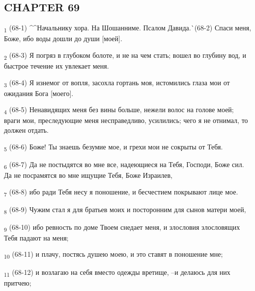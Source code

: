 \subsection{CHAPTER 69}
\begin{tcolorbox}
\textsubscript{1} (68-1) ^^Начальнику хора. На Шошанниме. Псалом Давида.^^ (68-2) Спаси меня, Боже, ибо воды дошли до души [моей].
\end{tcolorbox}
\begin{tcolorbox}
\textsubscript{2} (68-3) Я погряз в глубоком болоте, и не на чем стать; вошел во глубину вод, и быстрое течение их увлекает меня.
\end{tcolorbox}
\begin{tcolorbox}
\textsubscript{3} (68-4) Я изнемог от вопля, засохла гортань моя, истомились глаза мои от ожидания Бога [моего].
\end{tcolorbox}
\begin{tcolorbox}
\textsubscript{4} (68-5) Ненавидящих меня без вины больше, нежели волос на голове моей; враги мои, преследующие меня несправедливо, усилились; чего я не отнимал, то должен отдать.
\end{tcolorbox}
\begin{tcolorbox}
\textsubscript{5} (68-6) Боже! Ты знаешь безумие мое, и грехи мои не сокрыты от Тебя.
\end{tcolorbox}
\begin{tcolorbox}
\textsubscript{6} (68-7) Да не постыдятся во мне все, надеющиеся на Тебя, Господи, Боже сил. Да не посрамятся во мне ищущие Тебя, Боже Израилев,
\end{tcolorbox}
\begin{tcolorbox}
\textsubscript{7} (68-8) ибо ради Тебя несу я поношение, и бесчестием покрывают лице мое.
\end{tcolorbox}
\begin{tcolorbox}
\textsubscript{8} (68-9) Чужим стал я для братьев моих и посторонним для сынов матери моей,
\end{tcolorbox}
\begin{tcolorbox}
\textsubscript{9} (68-10) ибо ревность по доме Твоем снедает меня, и злословия злословящих Тебя падают на меня;
\end{tcolorbox}
\begin{tcolorbox}
\textsubscript{10} (68-11) и плачу, постясь душею моею, и это ставят в поношение мне;
\end{tcolorbox}
\begin{tcolorbox}
\textsubscript{11} (68-12) и возлагаю на себя вместо одежды вретище, --и делаюсь для них притчею;
\end{tcolorbox}
